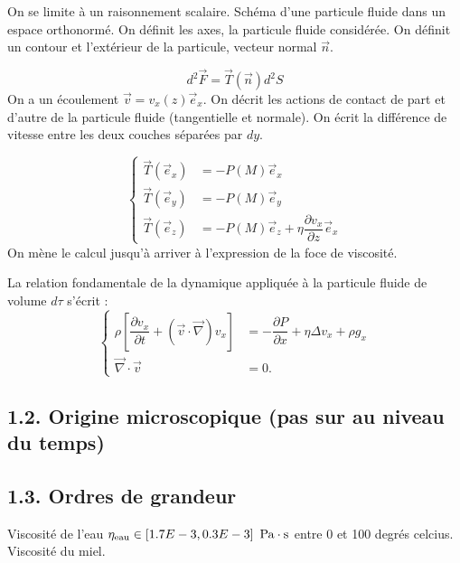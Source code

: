 \documentclass[french, a4paper, 10pt, twocolumn, landscape]{article}
\begin{document}
On se limite à un raisonnement scalaire. Schéma d'une particule fluide dans un espace orthonormé. On définit les axes, la particule fluide considérée. On définit un contour et l'extérieur de la particule, vecteur normal $\vec{n}$. 

\begin{equation}
    d^2\vec{F} = \vec{T}(\vec{n})d^2S
\end{equation}
On a un écoulement $\vec{v}=v_x(z)\vec{e}_x$. On décrit les actions de contact de part et d'autre de la particule fluide (tangentielle et normale). On écrit la différence de vitesse entre les deux couches séparées par $dy$.

\begin{equation}
    \left\{
    \begin{array}{ll}
    \vec{T}(\vec{e}_x) &= -P(M)\vec{e}_x\\    
    \vec{T}(\vec{e}_y)  &=-P(M)\vec{e}_y\\
    \vec{T}(\vec{e}_z) &= -P(M)\vec{e}_z + \eta\dfrac{\partial v_x}{\partial z}\vec{e}_x

    \end{array}
        \right.
\end{equation}
On mène le calcul jusqu'à arriver à l'expression de la foce de viscosité.\medskip 

La relation fondamentale de la dynamique appliquée à la particule fluide de volume $d\tau$ s'écrit :
\begin{equation}
    \left\{
        \begin{array}{cc}
            \rho\left[\dfrac{\partial v_x}{\partial t}+\left(\vec{v}\cdot \vec{\nabla}\right)v_x\right]&=-\dfrac{\partial P}{\partial x}+\eta\Delta v_x+\rho g_x\\
            \vec{\nabla}\cdot\vec{v} &=0.
        \end{array}
    \right.
\end{equation}

\subsection*{1.2. Origine microscopique (pas sur au niveau du temps)}

\subsection*{1.3. Ordres de grandeur}

Viscosité de l'eau $\eta_{\rm eau} \in \left[1.7E-3, 0.3E-3\right]~\rm Pa\cdot s$ entre 0 et 100 degrés celcius.
Viscosité du miel. 
\end{document}
